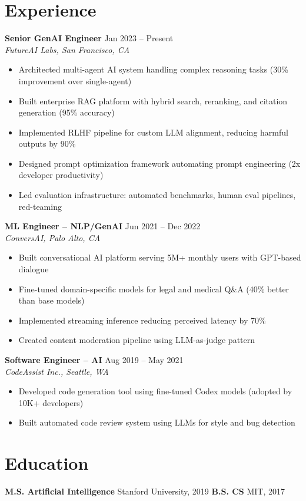 \documentclass[11pt,a4paper]{article}
\begin{document}
\section{Experience}

\noindent\textbf{Senior GenAI Engineer} \hfill \textcolor{accent}{Jan 2023 -- Present}\\
\textit{FutureAI Labs, San Francisco, CA}
\begin{itemize}[leftmargin=1.2em,nosep,label={\color{accent}$\star$}]
\item Architected multi-agent AI system handling complex reasoning tasks (30\% improvement over single-agent)
\item Built enterprise RAG platform with hybrid search, reranking, and citation generation (95\% accuracy)
\item Implemented RLHF pipeline for custom LLM alignment, reducing harmful outputs by 90\%
\item Designed prompt optimization framework automating prompt engineering (2x developer productivity)
\item Led evaluation infrastructure: automated benchmarks, human eval pipelines, red-teaming
\end{itemize}
\vspace{0.5em}

\noindent\textbf{ML Engineer -- NLP/GenAI} \hfill \textcolor{accent}{Jun 2021 -- Dec 2022}\\
\textit{ConversAI, Palo Alto, CA}
\begin{itemize}[leftmargin=1.2em,nosep,label={\color{accent}$\star$}]
\item Built conversational AI platform serving 5M+ monthly users with GPT-based dialogue
\item Fine-tuned domain-specific models for legal and medical Q\&A (40\% better than base models)
\item Implemented streaming inference reducing perceived latency by 70\%
\item Created content moderation pipeline using LLM-as-judge pattern
\end{itemize}
\vspace{0.5em}

\noindent\textbf{Software Engineer -- AI} \hfill \textcolor{accent}{Aug 2019 -- May 2021}\\
\textit{CodeAssist Inc., Seattle, WA}
\begin{itemize}[leftmargin=1.2em,nosep,label={\color{accent}$\star$}]
\item Developed code generation tool using fine-tuned Codex models (adopted by 10K+ developers)
\item Built automated code review system using LLMs for style and bug detection
\end{itemize}

\section{Education}
\noindent\textbf{M.S. Artificial Intelligence} \hfill Stanford University, 2019 \qquad \textbf{B.S. CS} \hfill MIT, 2017
\end{document}
